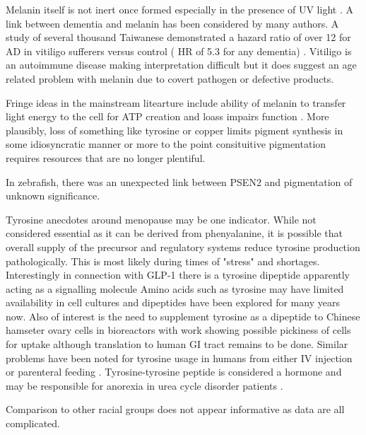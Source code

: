 
Melanin itself is not inert once formed especially
in the presence of UV light 
\cite{PMID41680087}.
A link between dementia and melanin has been considered by
many authors. 
  A study of several thousand Taiwanese demonstrated a 
hazard ratio of over 12 for AD in vitiligo sufferers versus
control ( HR of 5.3  for any  dementia)
\cite{Chang_Tai_Dai_Association_between_vitiligo_2021}.
Vitiligo is an autoimmune disease making interpretation difficult 
but it does suggest an age related problem with melanin due to 
covert pathogen or defective products.

Fringe ideas in the mainstream litearture include ability of melanin
to transfer light energy to the cell for ATP creation
and loass impairs function \cite{Berg_Berg_Melanin_unifying_theory_2023} .
More plausibly, loss of something like tyrosine or copper
limits pigment synthesis in some idiosyncratic manner or
more to the point consituitive pigmentation requires
resources that are no longer plentiful.

In zebrafish, there was an unexpected link between PSEN2 and
pigmentation \cite{10.1371/journal.pone.0206155}
of unknown significance. 

Tyrosine anecdotes around menopause may be one indicator.
While not considered essential as it can be derived from 
phenyalanine, it is possible that overall supply of the precursor
and regulatory systems reduce tyrosine production pathologically.
This is most likely during times of "stress" and shortages.
Interestingly in connection with GLP-1 there is a tyrosine
dipeptide apparently acting as a signalling molecule
Amino acids such as tyrosine may have limited availability
in cell cultures and dipeptides have been explored 
\cite{Kang_Mullen_Miranda_Utilization_tyrosine_2012} for many years now.
Also of interest is the need to supplement tyrosine as
a dipeptide to Chinese hamseter ovary cells in bioreactors
\cite{PMC7481768}
with work showing possible pickiness of cells for uptake
although translation to human GI tract remains to be done.
Similar problems have been noted for tyrosine usage in humans
from either IV injection or parenteral feeding \cite{MAHER1990685}.
Tyrosine-tyrosine peptide is considered a hormone and may
be responsible for anorexia in urea cycle disorder patients
\cite{PMC3336020}.

Comparison to other racial groups does not appear informative
as data are all complicated. 

